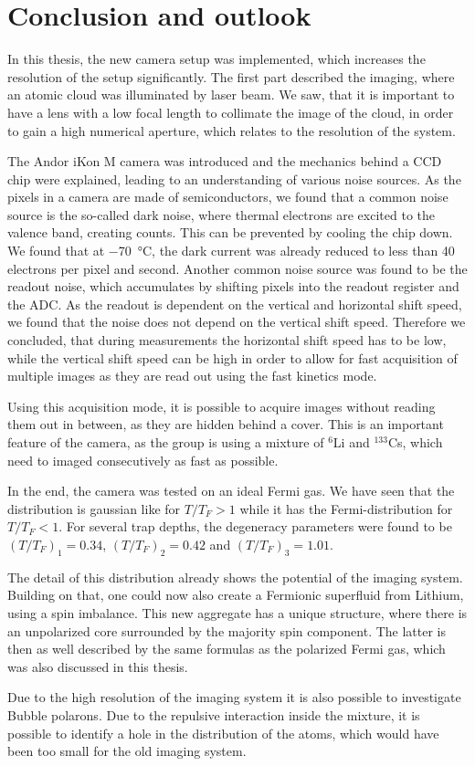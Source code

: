 \chapter{Conclusion and outlook}

In this thesis, the new camera setup was implemented, which increases the resolution of the setup significantly. The first part described the imaging, where an atomic cloud was illuminated by laser beam. We saw, that it is important to have a lens with a low focal length to collimate the image of the cloud, in order to gain a high numerical aperture, which relates to the resolution of the system.

The Andor iKon M camera was introduced and the mechanics behind a CCD chip were explained, leading to an understanding of various noise sources. As the pixels in a camera are made of semiconductors, we found that a common noise source is the so-called dark noise, where thermal electrons are excited to the valence band, creating counts. This can be prevented by cooling the chip down. We found that at \SI{-70}{\degreeCelsius}, the dark current was already reduced to less than 40 electrons per pixel and second. Another common noise source was found to be the readout noise, which accumulates by shifting pixels into the readout register and the ADC.
As the readout is dependent on the vertical and horizontal shift speed, we found that the noise does not depend on the vertical shift speed. Therefore we concluded, that during measurements the horizontal shift speed has to be low, while the vertical shift speed can be high in order to allow for fast acquisition of multiple images as they are read out using the fast kinetics mode.

Using this acquisition mode, it is possible to acquire images without reading them out in between, as they are hidden behind a cover. This is an important feature of the camera, as the group is using a mixture of $^6$Li and $^{133}$Cs, which need to imaged consecutively as fast as possible.

In the end, the camera was tested on an ideal Fermi gas. We have seen that the distribution is gaussian like for $T/T_F > 1$ while it has the Fermi-distribution for $T/T_F < 1$. For several trap depths, the degeneracy parameters were found to be $(T/T_F)_1 = 0.34$, $(T/T_F)_2 = 0.42$ and $(T/T_F)_3 = 1.01$.

The detail of this distribution already shows the potential of the imaging system. Building on that, one could now also create a Fermionic superfluid from Lithium, using a spin imbalance. This new aggregate has a unique structure, where there is an unpolarized core surrounded by the majority spin component\cite{Shin2006,Zwierlein2006b}. The latter is then as well described by the same formulas as the polarized Fermi gas, which was also discussed in this thesis.

Due to the high resolution of the imaging system it is also possible to investigate Bubble polarons. Due to the repulsive interaction inside the mixture, it is possible to identify a hole in the distribution of the atoms, which would have been too small for the old imaging system.
